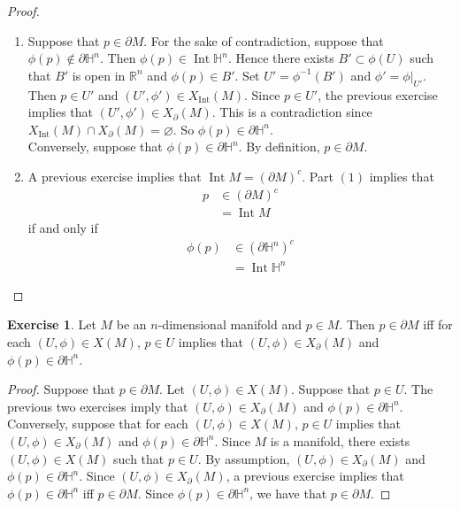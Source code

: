 \documentclass[12pt]{amsart}
\theoremstyle{definition}
\newtheorem{ex}[definition]{Exercise}
\renewcommand{\H}{\mathbb{H}}
\newcommand{\R}{\mathbb{R}}
\newcommand{\p}{\partial}
\DeclareMathOperator{\Int}{Int}
\begin{document}
	\begin{proof}\
		\begin{enumerate}
			\item Suppose that $p \in \p M$. For the sake of contradiction, suppose that $\phi(p) \not \in \p \H^n$. Then $\phi(p) \in \Int \H^n$. Hence there exists $B' \subset \phi(U)$ such that $B'$ is open in $\R^n$ and $\phi(p) \in B'$. Set $U' = \phi^{-1}(B')$ and $\phi' = \phi|_{U'}$. Then $p \in U'$ and $(U', \phi') \in X_{\Int}(M)$. Since $p \in U'$, the previous exercise implies that $(U', \phi') \in X_{\p}(M)$. This is a contradiction since $X_{\Int}(M) \cap X_{\p}(M) = \varnothing$. So $\phi(p) \in \p \H^n$.\\
			Conversely, suppose that $\phi(p) \in \p \H^n$. By definition, $p \in \p M$.
			\item A previous exercise implies that $\Int M = (\p M)^c$. Part $(1)$ implies that 
			\begin{align*}
				p
				& \in (\p M)^c \\
				& = \Int M
			\end{align*}
			if and only if
			\begin{align*}
				\phi(p)
				& \in (\p \H^n)^c \\
				& = \Int \H^n
			\end{align*}
		\end{enumerate}
	\end{proof}

	\begin{ex}
		Let $M$ be an $n$-dimensional manifold and $p \in M$. Then $p \in \partial M$ iff for each $(U, \phi) \in X(M)$, $p \in U$ implies that $(U, \phi) \in X_{\p}(M)$ and $\phi(p) \in \partial \H^n$. \\
	\end{ex}

	\begin{proof}
		Suppose that $p \in \partial M$. Let $(U, \phi) \in X(M)$. Suppose that $p \in U$. The previous two exercises imply that $(U, \phi) \in X_{\p}(M)$ and $\phi(p) \in \p \H^n$.\\
		Conversely, suppose that for each $(U, \phi) \in X(M)$, $p \in U$ implies that $(U, \phi) \in X_{\p}(M)$ and $\phi(p) \in \partial \H^n$. Since $M$ is a manifold, there exists $(U, \phi) \in X(M)$ such that $p \in U$. By assumption, $(U, \phi) \in X_{\p}(M)$ and $\phi(p) \in \p \H^n$. Since $(U, \phi) \in X_{\p}(M)$, a previous exercise implies that $\phi(p) \in \p \H^n$ iff $p \in \p M$. Since $\phi(p) \in \p \H^n$, we have that $p \in \p M$.
	\end{proof} 
	
\end{document}
